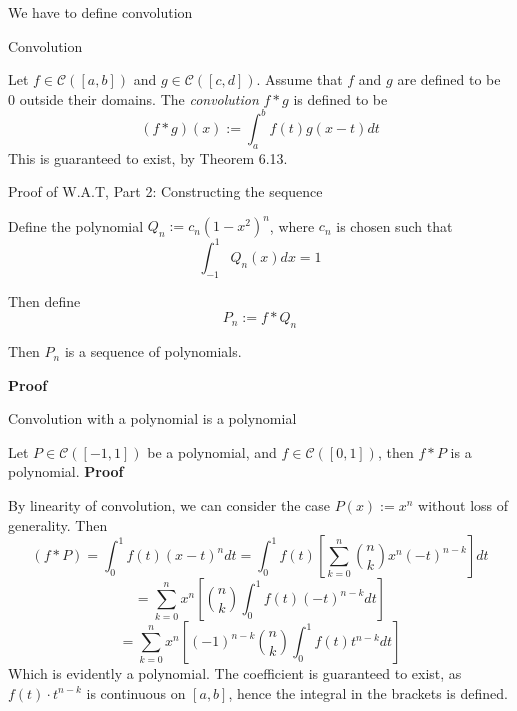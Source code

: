 We have to define convolution

\begin{definition} Convolution

    Let $f \in \mathscr{C}([a,b])$ and $g \in \mathscr{C}([c, d])$. Assume that $f$ and $g$ are defined to be $0$ outside their domains. The \textit{convolution} $f \ast g$ is defined to be
    \[(f \ast g)(x) := \int_a^b f(t)g(x-t) dt\]
    This is guaranteed to exist, by Theorem 6.13. 
\end{definition}

\begin{theorem} Proof of W.A.T, Part 2: Constructing the sequence

    Define the polynomial $Q_n := c_n(1-x^2)^n$, where $c_n$ is chosen such that
    \[\int_{-1}^1 Q_n(x)dx = 1\]

    Then define
    \[P_n := f \ast Q_n\]

    Then $P_n$ is a sequence of polynomials.

    \textbf{Proof}

    \begin{lemma} Convolution with a polynomial is a polynomial

        Let $P \in \mathscr{C}([-1, 1])$ be a polynomial, and $f \in \mathscr{C}([0, 1])$, then $f \ast P$ is a polynomial.
        \textbf{Proof}

        By linearity of convolution, we can consider the case $P(x) := x^n$ without loss of generality. Then
        \[(f \ast P) = \int_0^1 f(t)(x-t)^ndt = \int_0^1 f(t) \left[\sum_{k=0}^n \binom{n}{k}x^{n}(-t)^{n-k}\right]dt\]
        \[= \sum_{k=0}^n x^n \left[\binom{n}{k}\int_0^1 f(t) (-t)^{n-k}dt\right]\]
        \[= \sum_{k=0}^n x^n \left[(-1)^{n-k}\binom{n}{k}\int_0^1 f(t)t^{n-k}dt\right]\]
        Which is evidently a polynomial. The coefficient is guaranteed to exist, as $f(t) \cdot t^{n-k}$ is continuous on $[a, b]$, hence the integral in the brackets is defined.
    \end{lemma}

\end{theorem}



